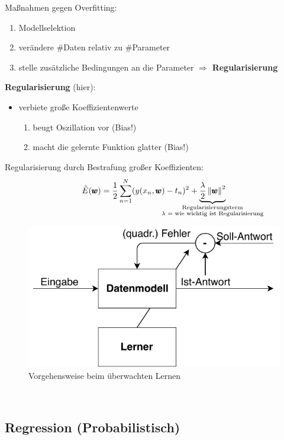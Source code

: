 	Maßnahmen gegen Overfitting:\vspace*{-5pt}
	\begin{enumerate}[$\hookrightarrow$]
		\item Modellselektion
		\item verändere \#Daten relativ zu \#Parameter
		\item stelle zusätzliche Bedingungen an die Parameter $\Rightarrow$ \textbf{Regularisierung}
	\end{enumerate}
	\textbf{Regularisierung} (hier):
	\begin{itemize}
		\item verbiete große Koeffizientenwerte\vspace*{-5pt}
		\begin{enumerate}[$\hookrightarrow$]
			\item beugt Oszillation vor (Bias!)
			\item macht die gelernte Funktion glatter (Bias!)
		\end{enumerate}
	\end{itemize}
	Regularisierung durch Bestrafung großer Koeffizienten:
	\begin{equation*}
		\tilde{E}(\pmb{w})=\frac{1}{2} \sum_{n=1}^{N}(y(x_n, \pmb{w})-t_n)^2+\underbrace{\frac{\lambda}{2}\left\Vert \pmb{w}\right\Vert^2}_{\mathclap{\substack{\text{Regularisierungsterm} \\ \text{$\lambda$ = wie wichtig ist Regularisierung}}}}
	\end{equation*}
	\begin{figure}[ht]
		\centering
		\includegraphics[width=.8\textwidth]{img/supervisedLearning}
		\caption{Vorgehensweise beim überwachten Lernen}
		\label{deployment}
	\end{figure}\\
	\subsection{Regression (Probabilistisch)}
